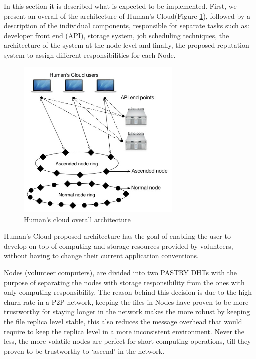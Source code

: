 \documentclass{./llncs2e/llncs}
\begin{document}
In this section it is described what is expected to be implemented. First, we present an overall of the architecture of Human's Cloud(Figure \ref{fig:overallarchitecture}), followed by a description of the individual components, responsible for separate tasks such as: developer front end (API), storage system, job scheduling techniques, the architecture of the system at the node level and finally, the proposed reputation system to assign different responsibilities for each Node.

\begin{figure}[h!]
  \centering
  \includegraphics[width=0.7\textwidth]{img/overall.jpg}
  \caption{Human's cloud overall architecture}
  \label{fig:overallarchitecture}
\end{figure}

Human's Cloud proposed architecture has the goal of enabling the user to develop on top of computing and storage resources provided by volunteers, without having to change their current application conventions. 

Nodes (volunteer computers), are divided into two PASTRY DHTs with the purpose of separating the nodes with storage responsibility from the ones with only computing responsibility. The reason behind this decision is due to the high churn rate in a P2P network, keeping the files in Nodes have proven to be more trustworthy for staying longer in the network makes the more robust by keeping the file replica level stable, this also reduces the message overhead that would require to keep the replica level in a more inconsistent environment. Never the less, the more volatile nodes are perfect for short computing operations, till they proven to be trustworthy to `ascend' in the network.
\end{document}
